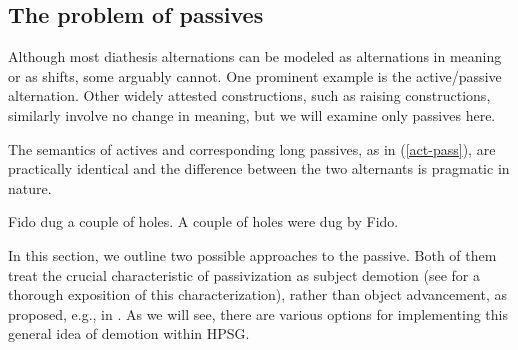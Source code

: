 \documentclass[output=paper,biblatex,babelshorthands,newtxmath,draftmode,colorlinks, citecolor=brown]{langscibook}
\begin{document}
\begin{exe}
	\ex\label{carve-sem}
	\begin{xlist}
	\ex \label{carve-sem-a}
\ex \label{carve-sem-b}
\end{xlist}
\end{exe}

 
\subsection{The problem of passives}
\label{passives}\label{arg-st:sec-passives}
Although most diathesis alternations can be modeled as alternations in meaning or as  shifts, some arguably cannot. 
One prominent example is the active/passive alternation.
Other widely attested constructions, such as raising constructions, similarly involve no change in meaning, but we will examine only passives here. 

The semantics of actives and corresponding long passives, as in (\ref{act-pass}), are practically identical and the difference between the two alternants is pragmatic in nature. 

\begin{exe}
	\ex\label{act-pass}
	\begin{xlist}
		\ex\label{act-pass-a}Fido dug a couple of holes.
		\ex\label{act-pass-b}A couple of holes were dug by Fido.
	\end{xlist}
\end{exe}

In this section, we outline two possible approaches to the passive.  Both of them treat the crucial
characteristic of passivization as subject demotion (see \citealt{Blevins2003} for a thorough
exposition of this characterization), rather than object advancement, as proposed, e.g., in
 \citep{PerlmutterandPostal1983b}.  As we will see, there are various
options for implementing this general idea of demotion within HPSG.
\end{document}
